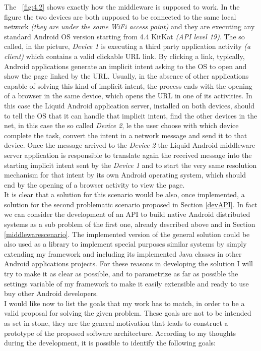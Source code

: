 The \figurename~\ref{fig:4.2} shows exactly how the middleware is supposed to work. In the figure the two devices are both supposed to be connected to the same local network \textit{(they are under the same WiFi access point)} and they are executing any standard Android OS version starting from 4.4 KitKat \textit{(API level 19)}. The so called, in the picture, \textit{Device 1} is executing a third party application activity \textit{(a client)}  which contains a valid clickable URL link. By clicking a link, typically, Android applications generate an implicit intent asking to the OS to open and show the page linked by the URL. Usually, in the absence of other applications capable of solving this kind of implicit intent, the process ends with the opening of a browser in the same device, which opens the URL in one of its activities. In this case the Liquid Android application server, installed on both devices, should to tell the OS that it can handle that implicit intent, find the other devices in the net, in this case the so called \textit{Device 2}, le the user choose with which device complete the task, convert the intent in a network message and send it to that device. Once the message arrived to the \textit{Device 2} the Liquid Android middleware server application is responsible to translate again the received message into the starting implicit intent sent by the \textit{Device 1} and to start the very same resolution mechanism for that intent by its own Android operating system, which should end by the opening of a browser activity to view the page.\\
It is clear that a solution for this scenario would be also, once implemented, a solution for the second problematic scenario proposed in Section \ref{devAPI}. In fact we can consider the development of an API to build native Android distributed systems as a sub problem of the first one, already described above and in Section \ref{middlewarescenario}. The implemented version of the general solution could be also used as a library to implement special purposes similar systems by simply extending my framework and including its implemented Java classes in other Android applications projects. For these reasons in developing the solution I will try to make it as clear as possible, and to parametrize as far as possible the settings variable of my framework to make it easily extensible and ready to use buy other Android developers.\\
I would like now to list the goals that my work has to match, in order to be a valid proposal for solving the given problem. These goals are not to be intended as set in stone, they are the general motivation that leads to construct a prototype of the proposed software architecture. According to my thoughts during the development, it is possible to identify the following goals:
